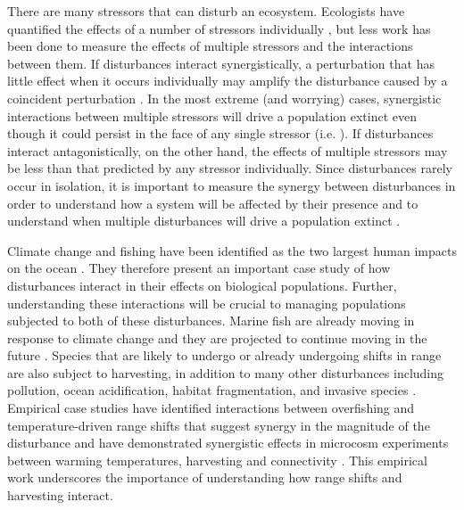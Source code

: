 \documentclass[12pt,english]{article}
\begin{document}
There are many stressors that can disturb an ecosystem. Ecologists have quantified the effects of a number of stressors individually \citep{Wilcoveetal1998, Crainetal2008, DarlingCote2008}, but less work has been done to measure the effects of multiple stressors and the interactions between them.  If disturbances interact synergistically, a perturbation that has little effect when it occurs individually may amplify the disturbance caused by a coincident perturbation \citep{Crainetal2008, DarlingCote2008,Nyeetal2013,Gurevitchetal2000}.   In the most extreme (and worrying) cases, synergistic interactions between multiple stressors will drive a population extinct even though it could persist in the face of any single stressor (i.e. \citet{Pelletieretal2006}).  If disturbances interact antagonistically, on the other hand, the effects of multiple stressors may be less than that predicted by any stressor individually.  Since disturbances rarely occur in isolation, it is important to measure the synergy between  disturbances in order to understand how a system will be affected by their presence and to understand when multiple disturbances will drive a population extinct  \citep{DoakMorris2010, Fordhametal2013, Foltetal1999}.

Climate change and fishing have been identified as the two largest human impacts on the ocean \citep{Halpernetal2008}.  They therefore present an important case study of how disturbances interact in their effects on biological populations.  Further, understanding these interactions will be crucial to managing populations subjected to both of these disturbances.  Marine fish are already moving in response to climate change \citep{Perryetal2005, HiddinkHoftstede2008, Rijnsdorpetal2009, Dulvyetal2008, Simpsonetal2011} and they are projected to continue moving in the future \citep{Kelletal2005, Mackenzieetal2007}.  Species that are likely to undergo or already undergoing shifts in range are also subject to harvesting, in addition to many other disturbances including pollution, ocean acidification, habitat fragmentation, and invasive species \citep{Wilcoveetal1998, Salaetal2000, MEA2005, Pinskyetal2013, Barryetal1995, Nyeetal2009}.  Empirical case studies have identified interactions between overfishing and temperature-driven range shifts that suggest synergy in the magnitude of the disturbance \citep{Lingetal2009} and have demonstrated synergistic effects in microcosm experiments between warming temperatures, harvesting and connectivity \citep{Moraetal2007}. This empirical work underscores the importance of understanding how range shifts and harvesting interact.
\end{document}
